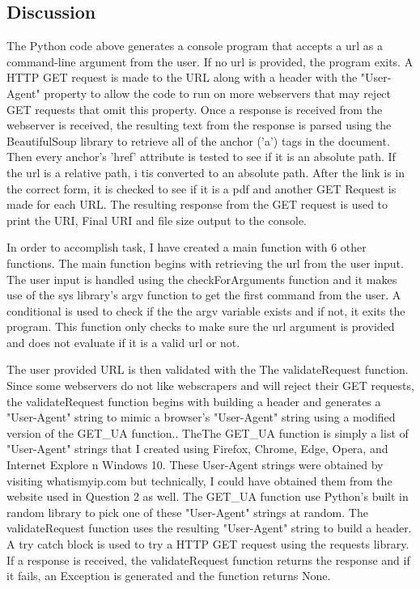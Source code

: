 \documentclass[12pt]{article}
\begin{document}
\subsection*{Discussion}

The Python code above generates a console program that accepts a url as a command-line argument from the user. If no url is provided, the program exits. A HTTP GET request is made to the URL along with a header with the "User-Agent" property to allow the code to run on more webservers that may reject GET requests that omit this property. Once a response is received from the webserver is received, the resulting text from the response is parsed using the BeautifulSoup library to retrieve all of the anchor ('a') tags in the document. Then every anchor's 'href' attribute is tested to see if it is an absolute path. If the url is a relative path, i tis converted to an absolute path. After the link is in the correct form, it is checked to see if it is a pdf and another GET Request is made for each URL. The resulting response from the GET request is used to print the URI, Final URI and file size output to the console. 

In order to accomplish task, I have created a main function with 6 other functions. The main function begins with retrieving the url  from the user input. The user input is handled using the checkForArguments function and it makes use of the sys library's argv function to get the first command from the user. A conditional is used to check if the the argv variable exists and if not, it exits the program. This function only checks to make sure the url argument is provided and does not evaluate if it is a valid url or not.

The user provided URL is then validated with the The validateRequest function. Since some webservers do not like webscrapers and will reject their GET requests, the validateRequest function begins with building a header and generates a "User-Agent" string to mimic a browser's "User-Agent" string using a modified version of the GET\_UA function.\cite{randomizeUserAgent}. TheThe GET\_UA function is simply a list of "User-Agent" strings that I created using Firefox, Chrome, Edge, Opera, and Internet Explore n Windows 10. These User-Agent strings were obtained by visiting whatismyip.com \cite{whatIsMyIp} but technically, I could have obtained them from the website used in Question 2 as well. The GET\_UA  function use Python's built in random library to pick one of these "User-Agent" strings at random. The validateRequest function uses the resulting "User-Agent" string to build a header. A try catch block is used to try a HTTP GET request using the requests library. If a response is received, the validateRequest function returns the response and if it fails, an Exception is generated and the function returns None. 
\end{document}
